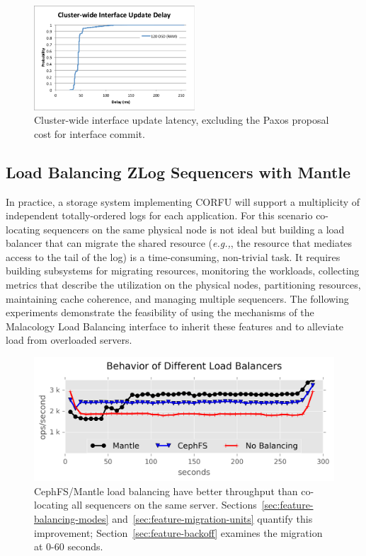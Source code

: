 \begin{figure}[tbp]
\centering
\includegraphics[width=60mm,trim={1 4 4 1.3cm},clip]{figures/iface-update-delay.pdf}
\caption{Cluster-wide interface update latency, excluding the Paxos proposal cost for
interface commit.}
\label{fig:propdelay}
\end{figure}

\subsection{Load Balancing ZLog Sequencers with Mantle}
\label{sec:zlog-balancing}

In practice, a storage system implementing CORFU will support a multiplicity of
independent totally-ordered logs for each application.  For this scenario
co-locating sequencers on the same physical node is not ideal but building a
load balancer that can migrate the shared resource ({\it e.g.,}, the resource
that mediates access to the tail of the log) is a time-consuming, non-trivial
task.  It requires building subsystems for migrating resources, monitoring the
workloads, collecting metrics that describe the utilization on the physical
nodes, partitioning resources, maintaining cache coherence, and managing
multiple sequencers. The following experiments demonstrate the feasibility of
using the mechanisms of the Malacology Load Balancing interface to inherit
these features and to alleviate load from overloaded servers.

\begin{figure}[t!]
\centering
\includegraphics{figures/mantle-balancer-behaviors.png}
\caption{CephFS/Mantle load balancing have better throughput than co-locating
all sequencers on the same server.  Sections~\ref{sec:feature-balancing-modes}
and~\ref{sec:feature-migration-units} quantify this improvement;
Section~\ref{sec:feature-backoff} examines the migration at 0-60 seconds.
}\label{fig:mantle-balancer-behaviors}
\end{figure}

